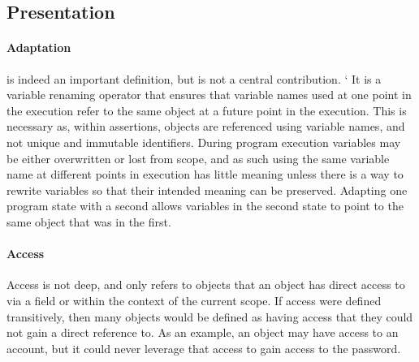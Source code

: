 \documentclass[11pt]{amsart}
\begin{document}
\subsection*{Presentation}
\paragraph{Adaptation} is indeed an important definition, but is not a central contribution. 
`%
It is a variable renaming operator that ensures that variable names 
used at one point in the execution refer to the same object at a future point in the execution. 
This is necessary as, within assertions, objects are referenced using variable names, and not unique and immutable identifiers.
During program execution variables may be either overwritten or lost from scope, and as such using the same variable name at 
different points in execution has little meaning unless there is a way to rewrite variables so that their intended meaning can 
be preserved. Adapting one program state with a second allows variables in the second state to point to the same object that was in the first.

\paragraph{Access} Access is not deep, and only refers to objects that an object has direct access to via a field or within the context of the current scope. If access were defined transitively, then many objects would be defined as having access that they could not gain a direct reference to. As an example, an object may have access to an account, but it could never leverage that access to gain access to the password.
\end{document}
